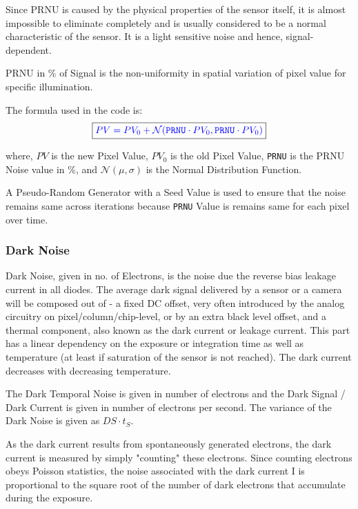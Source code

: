Since PRNU is caused by the physical properties of the sensor itself, it is almost impossible to eliminate completely and is usually considered to be a normal characteristic of the sensor. It is a light sensitive noise and hence, signal-dependent.

PRNU in \% of Signal is the non-uniformity in spatial variation of pixel value for specific illumination.

The formula used in the code is:
\begin{equation}
    \boxed{ \color{blue} PV = PV_0 + \mathcal{N}(\texttt{PRNU} \cdot PV_0, \texttt{PRNU} \cdot PV_0)   \color{black}}
\end{equation}

where, $PV$ is the new Pixel Value, $PV_0$ is the old Pixel Value, \texttt{PRNU} is the PRNU Noise value in \%, and $\mathcal{N}(\mu, \sigma)$ is the Normal Distribution Function.

A Pseudo-Random Generator with a Seed Value is used to ensure that the noise remains same across iterations because \texttt{PRNU} Value is remains same for each pixel over time. 


\subsubsection{Dark Noise} %
Dark Noise, given in no. of Electrons, is the noise due the reverse bias leakage current in all diodes. The average dark signal delivered by a sensor or a camera will be composed out of - a fixed DC offset, very often introduced by the analog circuitry on pixel/column/chip-level, or by an
extra black level offset, and a thermal component, also known as the dark current or leakage current. This part has a linear dependency on the exposure or integration time as well as temperature (at least if saturation of the sensor is not reached). The dark current decreases with decreasing temperature.

The Dark Temporal Noise is given in number of electrons and the Dark Signal / Dark Current is given in number of electrons per second. The variance of the Dark Noise is given as $DS \cdot t_S$.

As the dark current results from spontaneously generated electrons, the dark current is measured by simply "counting" these electrons. Since counting electrons obeys Poisson statistics, the noise associated with the dark current I is proportional to the square root of the number of dark electrons that accumulate during the exposure. 

